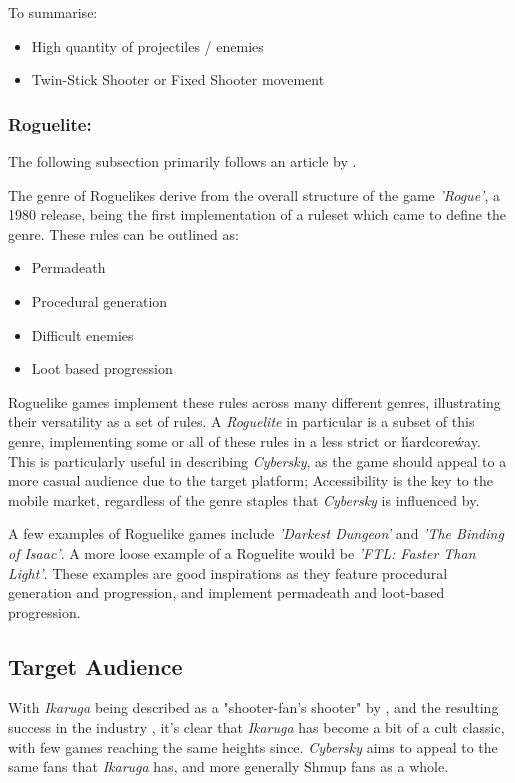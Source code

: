 \documentclass{scrartcl}
\let\cite\textcite
\let\citep\autocite
\begin{document}
To summarise:

\begin{itemize}
  \item High quantity of projectiles / enemies
  \item Twin-Stick Shooter or Fixed Shooter movement
\end{itemize}

\subsubsection{Roguelite:}

The following subsection primarily follows an article by \cite{BrianW2020-02}.

The genre of Roguelikes derive from the overall structure of the game \emph{'Rogue'}, a 1980 release, being the first implementation of a ruleset which came to define the genre. These rules can be outlined as:

\begin{itemize}
  \item Permadeath
  \item Procedural generation
  \item Difficult enemies
  \item Loot based progression
\end{itemize}

Roguelike games implement these rules across many different genres, illustrating their versatility as a set of rules. A \emph{Roguelite} in particular is a subset of this genre, implementing some or all of these rules in a less strict or \'hardcore\' way. This is particularly useful in describing \emph{Cybersky}, as the game should appeal to a more casual audience due to the target platform; Accessibility is the key to the mobile market, regardless of the genre staples that \emph{Cybersky} is influenced by.

A few examples of Roguelike games include \emph{'Darkest Dungeon'} and \emph{'The Binding of Isaac'}. A more loose example of a Roguelite would be \emph{'FTL: Faster Than Light'}. These examples are good inspirations as they feature procedural generation and progression, and implement permadeath and loot-based progression.

\subsection{Target Audience}

With \emph{Ikaruga} being described as a "shooter-fan's shooter" by \cite{Rodriguez2018}, and the resulting success in the industry \citep{BrianW2020-01}, it's clear that \emph{Ikaruga} has become a bit of a cult classic, with few games reaching the same heights since. \emph{Cybersky} aims to appeal to the same fans that \emph{Ikaruga} has, and more generally Shmup fans as a whole.
\end{document}
